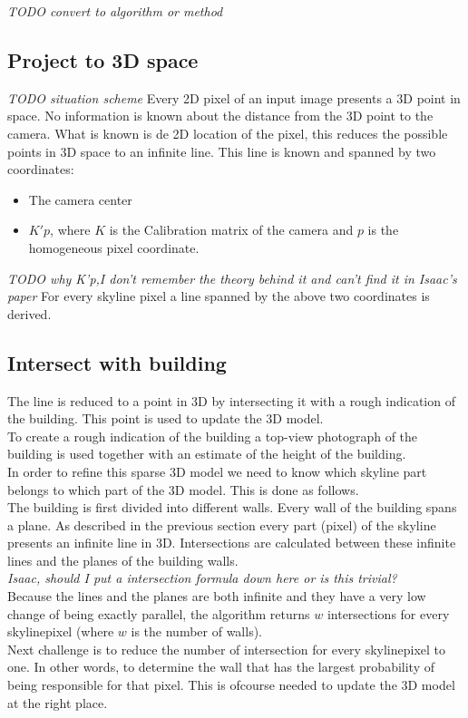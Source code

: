\documentclass[10pt]{article}
\begin{document}
\textit{TODO convert to algorithm or method }
 
\subsection{Project to 3D space}
\textit{ TODO situation scheme}
Every 2D pixel of an input image presents a 3D point in space. No
information is known about the distance from the 3D point to the camera. What
is known is de 2D location of the pixel, this reduces the possible points in 3D
space to an infinite line.  This line is known and spanned by two 
coordinates:\\ 
\begin{itemize}
	\item The camera center %
	\item $K'p$, where $K$ is the Calibration matrix of the camera and $p$ is the homogeneous pixel coordinate.
\end{itemize}

\textit{ TODO why K'p,I don't remember the theory behind it and can't find it in Isaac's paper }
For every skyline pixel a line spanned by the above two coordinates is derived.

\subsection{Intersect with building}
The line is reduced to a point in 3D by intersecting it with a rough indication
of the building. This point is used to update the 3D model.\\
To create a rough indication of the building a top-view photograph of the
building is used together with an estimate of the height of the building.\\ 
In order to refine this sparse 3D model we need to know which skyline part belongs to which part of
the 3D model. This is done as follows.\\
The building is first divided into different walls.  Every wall of the building spans a plane. 
As described in the previous section every part (pixel) of the skyline presents an infinite line in 3D.
Intersections are calculated between these infinite lines and the planes of the building walls.\\
\textit{ Isaac, should I put a intersection formula down here or is this trivial?}\\
Because the lines and the planes are both infinite and they have a very low change
of being exactly parallel, the algorithm returns $w$ intersections for every
skylinepixel (where $w$ is the number of walls).\\
Next challenge is to reduce the number of intersection for every skylinepixel
to one. In other words, to determine the wall that has the largest probability of
being responsible for that pixel. This is ofcourse needed to update the 3D
model at the right place.
\end{document}
